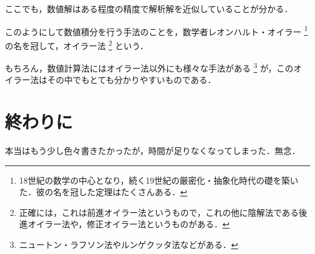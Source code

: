 ここでも，数値解はある程度の精度で解析解を近似していることが分かる．

このようにして数値積分を行う手法のことを，数学者レオンハルト・オイラー
\footnote{18世紀の数学の中心となり，続く19世紀の厳密化・抽象化時代の礎を築いた．彼の名を冠した定理はたくさんある．}
の名を冠して，オイラー法
\footnote{正確には，これは前進オイラー法というもので，これの他に陰解法である後進オイラー法や，修正オイラー法というものがある．}
という．

もちろん，数値計算法にはオイラー法以外にも様々な手法がある
\footnote{ニュートン・ラフソン法やルンゲクッタ法などがある．}
が，このオイラー法はその中でもとても分かりやすいものである．


\section{終わりに}
本当はもう少し色々書きたかったが，時間が足りなくなってしまった．無念．

